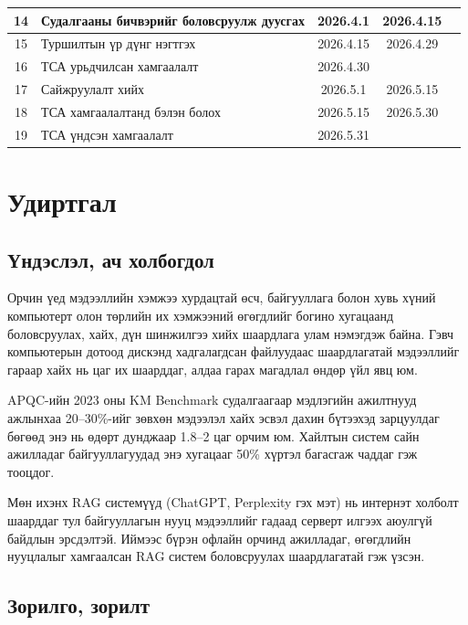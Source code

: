 \documentclass[11pt,a4paper]{article}
\begin{document}
\begin{table}[H]
\begin{tabularx}{\textwidth}{|c|X|c|c|c|}
\hline
14 & Судалгааны бичвэрийг боловсруулж дуусгах                 & 2026.4.1   & 2026.4.15  & \\
\hline
15 & Туршилтын үр дүнг нэгтгэх                                & 2026.4.15  & 2026.4.29  & \\
\hline
16 & ТСА урьдчилсан хамгаалалт                                & 2026.4.30  &            & \\
\hline
17 & Сайжруулалт хийх                                         & 2026.5.1   & 2026.5.15  & \\
\hline
18 & ТСА хамгаалалтанд бэлэн болох                            & 2026.5.15  & 2026.5.30  & \\
\hline
19 & ТСА үндсэн хамгаалалт                                    & 2026.5.31  &            & \\
\hline
\end{tabularx}
\end{table}

\newpage
\section{Удиртгал}

\subsection{Үндэслэл, ач холбогдол}

Орчин үед мэдээллийн хэмжээ хурдацтай өсч, байгууллага болон хувь хүний компьютерт олон төрлийн их хэмжээний өгөгдлийг богино хугацаанд боловсруулах, хайх, дүн шинжилгээ хийх шаардлага улам нэмэгдэж байна. Гэвч компьютерын дотоод дискэнд хадгалагдсан файлуудаас шаардлагатай мэдээллийг гараар хайх нь цаг их шаарддаг, алдаа гарах магадлал өндөр үйл явц юм.

APQC-ийн 2023 оны KM Benchmark судалгаагаар мэдлэгийн ажилтнууд ажлынхаа 20--30\%-ийг зөвхөн мэдээлэл хайх эсвэл дахин бүтээхэд зарцуулдаг бөгөөд энэ нь өдөрт дунджаар 1.8--2 цаг орчим юм. Хайлтын систем сайн ажилладаг байгууллагуудад энэ хугацааг 50\% хүртэл багасгаж чаддаг гэж тооцдог.

Мөн ихэнх RAG системүүд (ChatGPT, Perplexity гэх мэт) нь интернэт холболт шаарддаг тул байгууллагын нууц мэдээллийг гадаад серверт илгээх аюулгүй байдлын эрсдэлтэй. Иймээс бүрэн офлайн орчинд ажилладаг, өгөгдлийн нууцлалыг хамгаалсан RAG систем боловсруулах шаардлагатай гэж үзсэн.

\subsection{Зорилго, зорилт}
\end{document}
